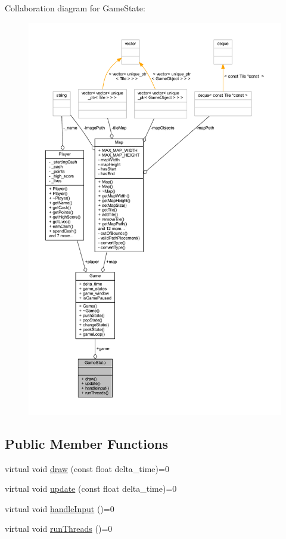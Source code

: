 Collaboration diagram for Game\+State\+:\nopagebreak
\begin{figure}[H]
\begin{center}
\leavevmode
\includegraphics[width=350pt]{class_game_state__coll__graph}
\end{center}
\end{figure}
\subsection*{Public Member Functions}
\begin{DoxyCompactItemize}
\item 
virtual void \hyperlink{class_game_state_a55a6a68aabdf7054ea0e6ddbf24902df}{draw} (const float delta\+\_\+time)=0
\item 
virtual void \hyperlink{class_game_state_ad331d02d3989271b8cbc88fcb1448959}{update} (const float delta\+\_\+time)=0
\item 
virtual void \hyperlink{class_game_state_a970b55edd5a1da31ea0f7113e2c1f85a}{handle\+Input} ()=0
\item 
virtual void \hyperlink{class_game_state_a98cd49f1d8fd9fc3e79d607a238ba518}{run\+Threads} ()=0
\end{DoxyCompactItemize}
